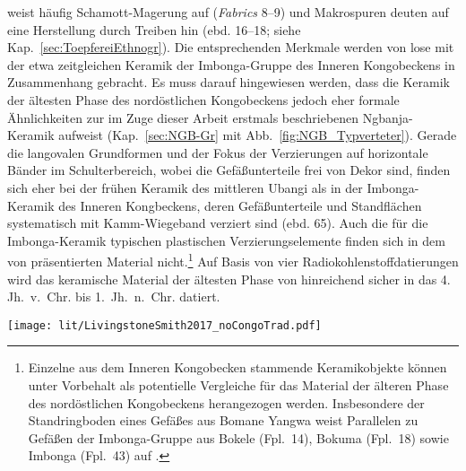 weist häufig Schamott-Magerung auf (\textit{Fabrics} 8--9) und Makrospuren deuten auf eine Herstellung durch Treiben hin (ebd. 16--18; siehe Kap.~\ref{sec:ToepfereiEthnogr}). Die entsprechenden Merkmale werden von \textcite[16]{LivingstoneSmith.2017} lose mit der etwa zeitgleichen Keramik der Imbonga-Gruppe des Inneren Kongobeckens \parencite[59--68]{Wotzka.1995} in Zusammenhang gebracht. Es muss darauf hingewiesen werden, dass die Keramik der ältesten Phase des nordöstlichen Kongobeckens jedoch eher formale Ähnlichkeiten zur im Zuge dieser Arbeit erstmals beschriebenen Ngbanja-Keramik aufweist (Kap.~\ref{sec:NGB-Gr} mit Abb.~\ref{fig:NGB_Typverteter}). Gerade die langovalen Grundformen und der Fokus der Verzierungen auf horizontale Bänder im Schulterbereich, wobei die Gefäßunterteile frei von Dekor sind, finden sich eher bei der frühen Keramik des mittleren Ubangi als in der Imbonga-Keramik des Inneren Kongbeckens, deren Gefäßunterteile und Standflächen systematisch mit Kamm-Wiegeband verziert sind (ebd. 65). Auch die für die Imbonga-Keramik typischen plastischen Verzierungselemente finden sich in dem von \textcite[18 Abb.~24]{LivingstoneSmith.2017} präsentierten Material nicht.\footnote{Einzelne aus dem Inneren Kongobecken stammende Keramikobjekte können unter Vorbehalt als potentielle Vergleiche für das Material der älteren Phase des nordöstlichen Kongobeckens herangezogen werden. Insbesondere der Standringboden eines Gefäßes aus Bomane Yangwa \parencites[14 Abb.~3]{LivingstoneSmith.2011} weist Parallelen zu Gefäßen der Imbonga-Gruppe aus Bokele (Fpl.~14), Bokuma (Fpl.~18) sowie Imbonga (Fpl.~43) auf \parencite[453 Taf.~19.4, 6, 9, 470 Taf.~36.12, 471 Taf.~37.7, 490 Taf.~56.2]{Wotzka.1995}.} Auf Basis von vier Radiokohlenstoffdatierungen wird das keramische Material der ältesten Phase von \textcite[17 Abb.~23]{LivingstoneSmith.2017} hinreichend sicher in das 4. Jh.~v.~Chr. bis 1.~Jh.~n.~Chr. datiert.

\begin{figure*}[tb!]
	\centering
	\texttt{[image: lit/LivingstoneSmith2017\_noCongoTrad.pdf]}
	\caption{Nordöstliches Kongobecken: Regionale Sequenz nach \textcite{LivingstoneSmith.2017}.\\{\footnotesize 1--3: \textit{Ältere Phase} (\textit{cf}. Bomane Yangwa; ebd. 18 Abb. 2--4); 4--7: \textit{Mittlerer Phase} (\textit{cf}. Ilambi Moke; ebd. 19 Abb. 25.3, 25.1, 25.2, 25.8); 8--9: Ilambi-Gruppe (ebd. 19 Abb.~26.5, 26.1); 10--12: Yaekela-Gruppe (ebd. 20 Abb.~27.1, 27.6, 27.2); 13 Nkomba-Gruppe (ebd. 20 Abb.~28.1).}}
	\label{fig:LivingstoneSmith2017_noCongoTrad}
\end{figure*}

